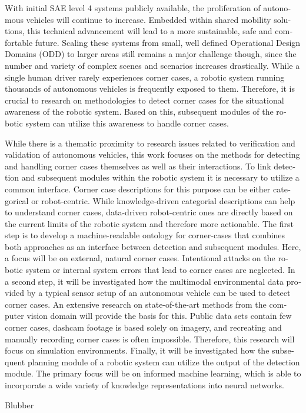 \begin{otherlanguage}{english} %
With initial SAE level 4 systems publicly available, the proliferation of autonomous vehicles will continue to increase. Embedded within shared mobility solutions, this technical advancement will lead to a more sustainable, safe and comfortable future. Scaling these systems from small, well defined Operational Design Domains (ODD) to larger areas still remains a major challenge though, since the number and variety of complex scenes and scenarios increases drastically. While a single human driver rarely experiences corner cases, a robotic system running thousands of autonomous vehicles is frequently exposed to them.
Therefore, it is crucial to research on methodologies to detect corner cases for the situational awareness of the robotic system. Based on this, subsequent modules of the robotic system can utilize this awareness to handle corner cases.

While there is a thematic proximity to research issues related to verification and validation of autonomous vehicles, this work focuses on the methods for detecting and handling corner cases themselves as well as their interactions.
To link detection and subsequent modules within the robotic system it is necessary to utilize a common interface. Corner case descriptions for this purpose can be either categorical or robot-centric. While knowledge-driven categorial descriptions can help to understand corner cases, data-driven robot-centric ones are directly based on the current limits of the robotic system and therefore more actionable. The first step is to develop a machine-readable ontology for corner-cases that combines both approaches as an interface between detection and subsequent modules. Here, a focus will be on external, natural corner cases. Intentional attacks on the robotic system or internal system errors that lead to corner cases are neglected.
In a second step, it will be investigated how the multimodal environmental data provided by a typical sensor setup of an autonomous vehicle can be used to detect corner cases. An extensive research on state-of-the-art methods from the computer vision domain will provide the basis for this. Public data sets contain few corner cases, dashcam footage is based solely on imagery, and recreating and manually recording corner cases is often impossible. Therefore, this research will focus on simulation environments. Finally, it will be investigated how the subsequent planning module of a robotic system can utilize the output of the detection module. The primary focus will be on informed machine learning, which is able to incorporate a wide variety of knowledge representations into neural networks.

\end{otherlanguage}

\begin{otherlanguage}{ngerman} %
Blubber
\end{otherlanguage}

